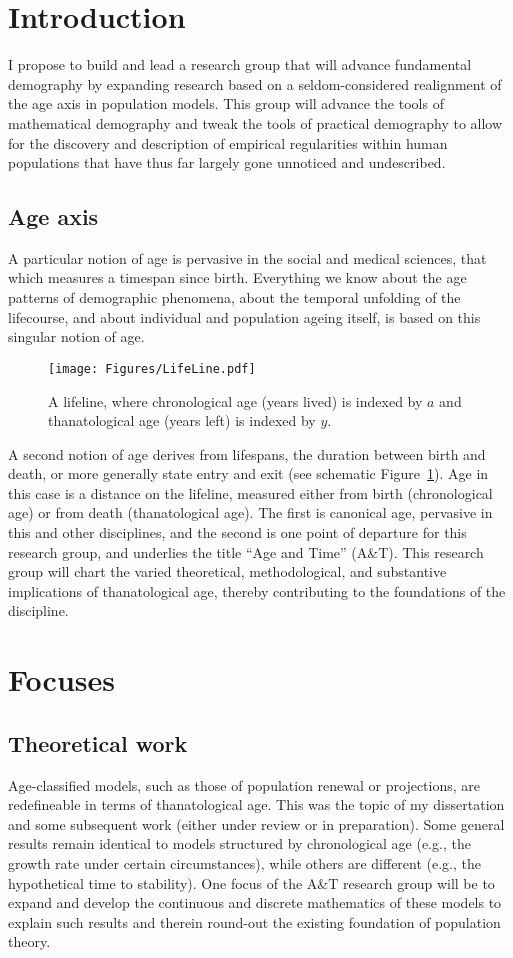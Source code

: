 \documentclass[a4paper,12pt]{article}
\begin{document}
\section{Introduction}
I propose to build and lead a research group that will advance fundamental
demography by expanding research based on a seldom-considered realignment of
the age axis in population models. This group will advance the tools of
mathematical demography and tweak the tools of practical demography to allow for
the discovery and description of empirical regularities within human populations that have thus far largely gone unnoticed and undescribed.

\subsection*{Age axis}
A particular notion of age is pervasive in the social and medical sciences, that
which measures a timespan since birth.
Everything we know about the age patterns of demographic phenomena, about the temporal
unfolding of the lifecourse, and about individual and population ageing itself,
is based on this singular notion of age. 

\begin{figure}[h]
\centering
	\caption{A lifeline, where chronological age (years lived) is indexed by $a$
	and thanatological age (years left) is indexed by $y$.}
	\label{fig:line}
	\texttt{[image: Figures/LifeLine.pdf]}	
\end{figure}

A second notion of age derives from lifespans, the duration between birth and
death, or more generally state entry and exit (see schematic
Figure~\ref{fig:line}).
Age in this case is a distance on the lifeline, measured either from birth (chronological age) or from death
(thanatological age). The first is canonical age, pervasive in this and
other disciplines, and the second is one point of departure for this research
group, and underlies the title ``Age and Time'' (A\&T). This research group
will chart the varied theoretical, methodological, and substantive
implications of thanatological age, thereby contributing to the foundations of the discipline.

\section{Focuses}
\subsection{Theoretical work}
Age-classified models, such as those of population renewal or projections, are
redefineable in terms of thanatological age. This was the topic of my
dissertation and some subsequent work (either under review or in preparation).
Some general results remain identical to models structured by chronological age (e.g., the growth rate under certain
circumstances), while others are different (e.g., the hypothetical time to
stability). One focus of the A\&T research group will be to
expand and develop the continuous and discrete mathematics of these models to explain such results and therein round-out the existing foundation of population theory.
\end{document}
